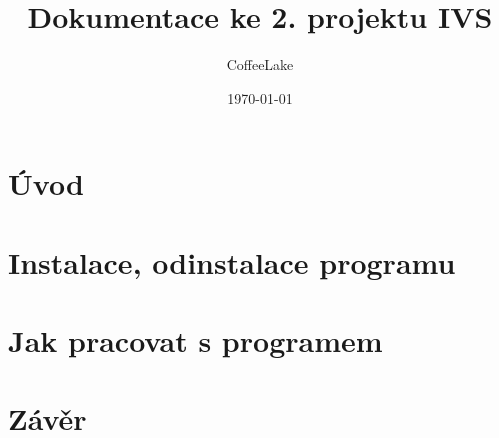 \documentclass[a4paper, 11pt]{article}
\title{Dokumentace ke 2. projektu IVS}
\author{CoffeeLake}
\date{\today}
\begin{document}
	
\maketitle
\tableofcontents


\newpage

\section{Úvod}

\section{Instalace, odinstalace programu}

\section{Jak pracovat s programem}

\section{Závěr}
\end{document}
